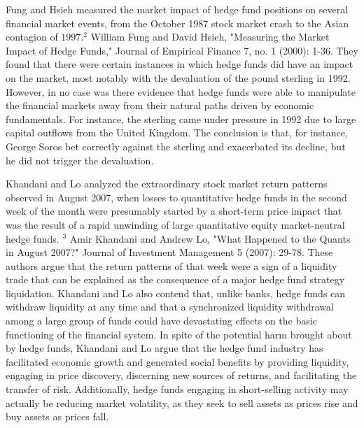 \documentclass[11pt]{article}
\begin{document}
Fung and Hsieh measured the market impact of hedge fund positions on several financial market events, from the October 1987 stock market crash to the Asian contagion of $1997 .{ }^{2}$ William Fung and David Hsieh, "Measuring the Market Impact of Hedge Funds," Journal of Empirical Finance 7, no. 1 (2000): 1-36. They found that there were certain instances in which hedge funds did have an impact on the market, most notably with the devaluation of the pound sterling in 1992. However, in no case was there evidence that hedge funds were able to manipulate the financial markets away from their natural paths driven by economic fundamentals. For instance, the sterling came under pressure in 1992 due to large capital outflows from the United Kingdom. The conclusion is that, for instance, George Soros bet correctly against the sterling and exacerbated its decline, but he did not trigger the devaluation.

Khandani and Lo analyzed the extraordinary stock market return patterns observed in August 2007, when losses to quantitative hedge funds in the second week of the month were presumably started by a short-term price impact that was the result of a rapid unwinding of large quantitative equity market-neutral hedge funds. ${ }^{3}$ Amir Khandani and Andrew Lo, "What Happened to the Quants in August 2007?" Journal of Investment Management 5 (2007): 29-78. These authors argue that the return patterns of that week were a sign of a liquidity trade that can be explained as the consequence of a major hedge fund strategy liquidation. Khandani and Lo also contend that, unlike banks, hedge funds can withdraw liquidity at any time and that a synchronized liquidity withdrawal among a large group of funds could have devastating effects on the basic functioning of the financial system. In spite of the potential harm brought about by hedge funds, Khandani and Lo argue that the hedge fund industry has facilitated economic growth and generated social benefits by providing liquidity, engaging in price discovery, discerning new sources of returns, and facilitating the transfer of risk. Additionally, hedge funds engaging in short-selling activity may actually be reducing market volatility, as they seek to sell assets as prices rise and buy assets as prices fall.
\end{document}
